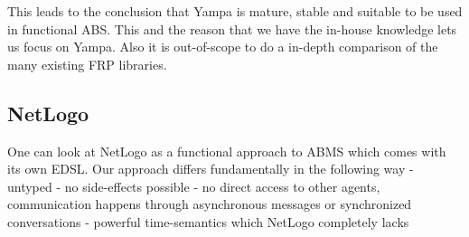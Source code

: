This leads to the conclusion that Yampa is mature, stable and suitable to be used in functional ABS. This and the reason that we have the in-house knowledge lets us focus on Yampa. Also it is out-of-scope to do a in-depth comparison of the many existing FRP libraries.

\subsection{NetLogo}
One can look at NetLogo as a functional approach to ABMS which comes with its own EDSL. Our approach differs fundamentally in the following way
	- untyped
	- no side-effects possible
	- no direct access to other agents, communication happens through asynchronous messages or synchronized conversations
	- powerful time-semantics which NetLogo completely lacks 
